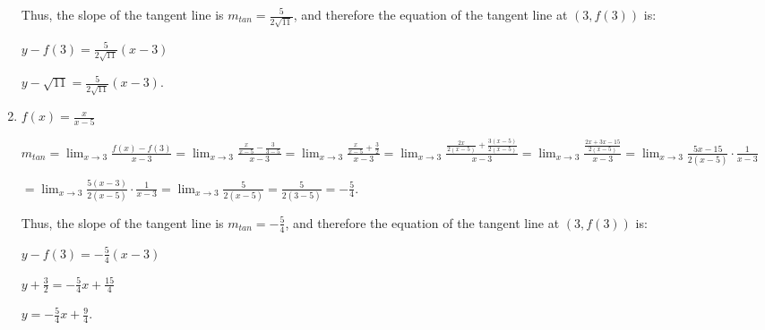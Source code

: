 \documentclass[handout,nooutcomes]{ximera}
\begin{document}
\begin{problem}
\begin{enumerate}
\begin{freeResponse}
		Thus, the slope of the tangent line is $m_{tan}=\frac{5}{2\sqrt{11}}$, and therefore the equation of the tangent line at $(3, f(3))$ is:
		
		$y - f(3) = \frac{5}{2\sqrt{11}}(x-3)$
		
		$y - \sqrt{11} = \frac{5}{2\sqrt{11}}(x - 3).$
		\end{freeResponse}
		
	
	\item  $f(x) = \frac{x}{x-5}$
		\begin{freeResponse}
		$m_{tan} = \lim_{x \to 3} \frac{f(x) - f(3)}{x-3}
		= \lim_{x \to 3} \frac{\frac{x}{x-5} - \frac{3}{3-5}}{x-3}
		= \lim_{x \to 3} \frac{\frac{x}{x-5} + \frac{3}{2}}{x-3}
		= \lim_{x \to 3} \frac{\frac{2x}{2(x-5)} + \frac{3(x-5)}{2(x-5)}}{x-3}
		= \lim_{x \to 3} \frac{\frac{2x + 3x - 15}{2(x-5)}}{x-3}
		= \lim_{x \to 3} \frac{5x-15}{2(x-5)} \cdot \frac{1}{x-3}$
		
		$= \lim_{x \to 3} \frac{5(x-3)}{2(x-5)} \cdot \frac{1}{x-3}
		= \lim_{x \to 3} \frac{5}{2(x-5)}
		= \frac{5}{2(3-5)} = -\frac{5}{4}.$
		
		Thus, the slope of the tangent line is $m_{tan}=- \frac{5}{4}$, and therefore the equation of the tangent line at $(3, f(3))$ is:
		
		$y - f(3) = - \frac{5}{4}(x-3)$
		
		$y + \frac{3}{2} = - \frac{5}{4}x + \frac{15}{4}$
		
		$y = - \frac{5}{4} x + \frac{9}{4}.$
		\end{freeResponse}
		
	
	\end{enumerate}
\end{problem}
\end{document}
